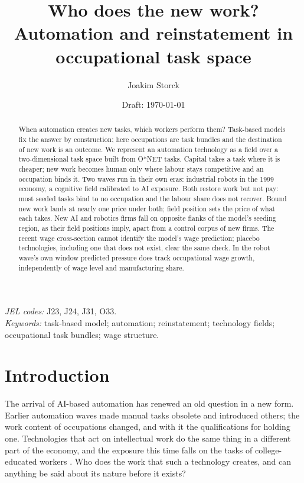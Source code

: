\documentclass[12pt, a4paper]{article}
\title{Who does the new work? Automation and reinstatement in
occupational task space}
\author{Joakim Storck}
\date{Draft: \today}
\begin{document}
\maketitle

\begin{abstract}
\noindent
When automation creates new tasks, which workers perform them? Task-based
models fix the answer by construction; here occupations are task bundles
and the destination of new work is an outcome. We represent an automation
technology as a field over a two-dimensional task space built from O*NET
tasks. Capital takes a task where it is cheaper; new work becomes human
only where labour stays competitive and an occupation binds it. Two waves
run in their own eras: industrial robots in the 1999 economy, a cognitive
field calibrated to AI exposure. Both restore work but not pay: most
seeded tasks bind to no occupation and the labour share does not recover.
Bound new work lands at nearly one price under both; field position sets
the price of what each takes. New AI and robotics firms fall on opposite
flanks of the model's seeding region, as their field positions imply,
apart from a control corpus of new firms. The recent wage cross-section
cannot identify the model's wage prediction; placebo technologies,
including one that does not exist, clear the same check. In the robot
wave's own window predicted pressure does track occupational wage growth,
independently of wage level and manufacturing share.
\end{abstract}

\vspace{0.5em}
\noindent\emph{JEL codes:} J23, J24, J31, O33.\\
\emph{Keywords:} task-based model; automation; reinstatement;
technology fields; occupational task bundles; wage structure.

\section{Introduction}
\label{sec:intro}

The arrival of AI-based automation has renewed an old question in a new
form. Earlier automation waves made manual tasks obsolete and introduced
others; the work content of occupations changed, and with it the
qualifications for holding one. Technologies that act on intellectual
work do the same thing in a different part of the economy, and the
exposure this time falls on the tasks of college-educated workers
\parencite{eloundou2024, hampole2025}. Who does the work that such a
technology creates, and can anything be said about its nature before it
exists?
\end{document}
